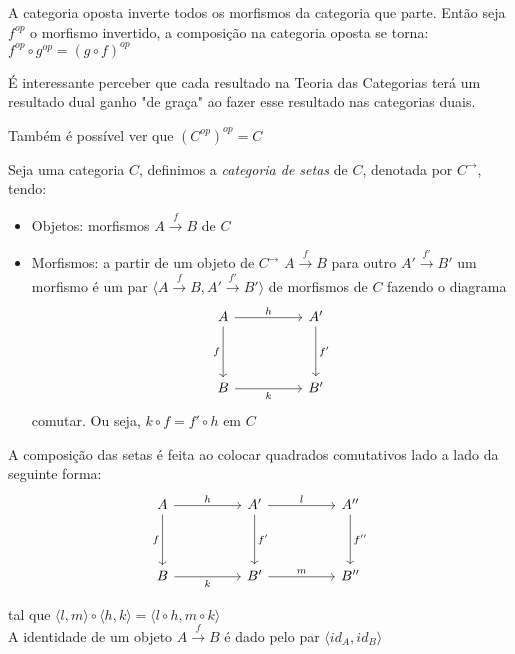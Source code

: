 \documentclass[../main.tex]{subfiles}
\begin{document}
A categoria oposta inverte todos os morfismos da categoria que parte. Então seja $f^{op}$ o morfismo invertido, a composição na categoria oposta se torna: $f^{op} \circ g^{op} = (g \circ f)^{op}$

É interessante perceber que cada resultado na Teoria das Categorias terá um resultado dual ganho "de graça" ao fazer esse resultado nas categorias duais.

Também é possível ver que $(C^{op})^{op} = C$

\begin{definition}
    Seja uma categoria $C$, definimos a \emph{categoria de setas} de $C$, denotada por $C^{\to}$, tendo:
    \begin{itemize}
        \item Objetos: morfismos $A \xrightarrow{f} B$ de $C$
        \item Morfismos: a partir de um objeto de $C^{\to}$ $A \xrightarrow{f} B$ para outro $A' \xrightarrow{f'} B'$ um morfismo é um par $\langle A \xrightarrow{f} B, A' \xrightarrow{f'} B' \rangle$ de morfismos de $C$ fazendo o diagrama
        \[\begin{tikzcd}
            A && {A'} \\
            \\
            B && {B'}
            \arrow["h", from=1-1, to=1-3]
            \arrow["f"', from=1-1, to=3-1]
            \arrow["{f'}", from=1-3, to=3-3]
            \arrow["k"', from=3-1, to=3-3]
        \end{tikzcd}\]
        comutar. Ou seja, $k \circ f = f' \circ h$ em $C$
    \end{itemize}

    A composição das setas é feita ao colocar quadrados comutativos lado a lado da seguinte forma:
    \[\begin{tikzcd}
        A && {A'} && {A''} \\
        \\
        B && {B'} && {B''}
        \arrow["h", from=1-1, to=1-3]
        \arrow["f"', from=1-1, to=3-1]
        \arrow["l", from=1-3, to=1-5]
        \arrow["{f'}", from=1-3, to=3-3]
        \arrow["{f''}", from=1-5, to=3-5]
        \arrow["k"', from=3-1, to=3-3]
        \arrow["m", from=3-3, to=3-5]
    \end{tikzcd}\]

    tal que $\langle l, m \rangle \circ \langle h, k \rangle = \langle l \circ h, m \circ k \rangle$
    \\
    A identidade de um objeto $A \xrightarrow{f} B$ é dado pelo par $\langle id_A, id_B \rangle$

\end{definition}
\end{document}
